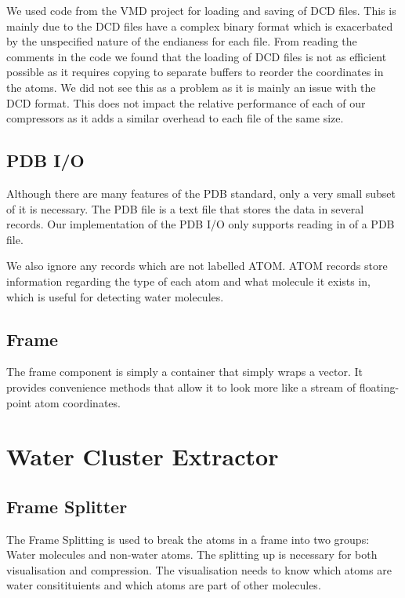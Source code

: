 \documentclass[a4paper,11pt]{report}
\begin{document}
We used code from the VMD project for loading and saving of DCD files. This is mainly due to the DCD files have a complex binary format which is exacerbated by the unspecified nature of the endianess for each file. From reading the comments in the code we found that the loading of DCD files is not as efficient possible as it requires copying to separate buffers to reorder the coordinates in the atoms. We did not see this as a problem as it is mainly an issue with the DCD format. This does not impact the relative performance of each of our compressors as it adds a similar overhead to each file of the same size.

\subsection{PDB I/O}

Although there are many features of the PDB standard, only a very small subset of it is necessary. The PDB file is a text file that stores the data in several records. Our implementation of the PDB I/O only supports reading in of a PDB file. 

We also ignore any records which are not labelled ATOM. ATOM records store information regarding the type of each atom and what molecule it exists in, which is useful for detecting water molecules.

\subsection{Frame}

The frame component is simply a container that simply wraps a vector. It provides convenience methods that allow it to look more like a stream of floating-point atom coordinates.

\section{Water Cluster Extractor}

\subsection{Frame Splitter}

The Frame Splitting is used to break the atoms in a frame into two groups: Water molecules and non-water atoms. The splitting up is necessary for both visualisation and compression. The visualisation needs to know which atoms are water consitituients and which atoms are part of other molecules. 
\end{document}

